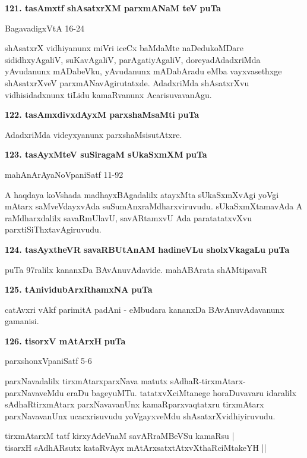 \medskip
\noindent
\textbf{121. tasAmxtf shAsatxrXM parxmANaM teV} \hfill{\bf puTa \pageref{87}}

\hfill{BagavadigxVtA 16-24}

\smallskip
shAsatxrX vidhiyanunx miVri iceCx baMdaMte naDedukoMDare sididhxyAgaliV, suKavAgaliV, parAgatiyAgaliV, doreyadAdadxriMda yAvudanunx mADabeVku, yAvudanunx mADabAradu eMba vayxvasethxge shAsatxrXveV parxmANavAgirutatxde. AdadxriMda shAsatxrXvu vidhisidadxnunx tiLidu kamaRvanunx AcarisuvavanAgu.

\medskip
\noindent
\textbf{122. tasAmxdivxdAyxM parxshaMsaMti} \hfill{\bf puTa \pageref{86f}}

\smallskip
AdadxriMda videyxyanunx parxshaMsisutAtxre.

\medskip
\noindent
\textbf{123. tasAyxMteV suSiragaM sUkaSxmXM} \hfill{\bf puTa \pageref{124}}

\hfill{mahAnArAyaNoVpaniSatf 11-92}

\smallskip
A haqdaya koVshada madhayxBAgadalilx atayxMta sUkaSxmXvAgi yoVgi mAtarx saMveVdayxvAda suSumAnxraMdharxviruvudu. sUkaSxmXtamavAda A raMdharxdalilx savaRmUlavU, savARtamxvU Ada paratatatxvXvu parxtiSiThxtavAgiruvudu.

\eject

\noindent
\textbf{124. tasAyxtheVR savaRBUtAnAM hadineVLu sholxVkagaLu} \hfill{\bf puTa \pageref{96a}}

puTa 97ralilx kananxDa BAvAnuvAdavide. \hfill{mahABArata shAMtipavaR}

\smallskip

\noindent
\textbf{125. tAnividubArxRhamxNA} \hfill{\bf puTa \pageref{205}}

\smallskip
catAvxri vAkf parimitA padAni - eMbudara kananxDa BAvAnuvAdavanunx gamanisi.

\medskip
\noindent
\textbf{126. tisorxV mAtArxH} \hfill{\bf puTa \pageref{148c}}

\hfill{parxshonxVpaniSatf 5-6}

\smallskip
parxNavadalilx tirxmAtarxparxNava matutx sAdhaR-tirxmAtarx-parxNavaveMdu eraDu bageyuMTu. tatatxvXciMtanege horaDuvavaru idaralilx sAdhaRtirxmAtarx parxNavavanUnx kamaRparxvaqtatxru tirxmAtarx parxNavavanUnx ucacxrisuvudu yoVgayxveMdu shAsatxrXvidhiyiruvudu.

\smallskip
\begin{shloka}
tirxmAtarxM tatf kirxyAdeVnaM savARraMBeVSu kamaRsu |\\
tisarxH sAdhARsutx kataRvAyx mAtArxsatxtAtxvXthaRciMtakeYH ||
\end{shloka}

